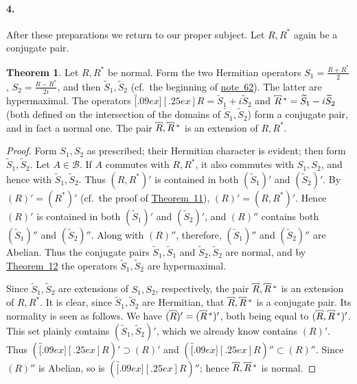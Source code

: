 \documentclass[
  paper=b5,
  twoside=true,
  fontsize=13pt,
  headings=normal,
  bookmarkpackage=false
]{scrartcl}
\theoremstyle{definition}
\newtheorem{theorem}{Theorem}
\newcommand{\NoteRef}[1]{\hyperref[fn:#1]{note~#1}}
\newcommand{\TheoremRef}[1]{\hyperref[thm:#1]{Theorem~#1}}
\newcommand{\MaximalExtension}[1]{\overbracket[.09ex][.25ex]{#1}}
\newcommand{\AdjointMaximalExtension}[1]{\MaximalExtension{#1}\vphantom{#1}^{*}}
\begin{document}
\paragraph*{4.}\label{sec:iv-4}
After these preparations we return to our proper subject.  Let
\(R,R^*\) again be a conjugate pair.

\begin{theorem}\label{thm:14}
Let \(R,R^*\) be normal. Form the two Hermitian operators
\({S_1=\frac{R+R^*}{2}}\), \({S_2=\frac{R-R^*}{2i}}\), and then
\(\widetilde S_1,\widetilde S_2\) (cf.\ the beginning of
\NoteRef{62}). The latter are hypermaximal. The operators
\(\MaximalExtension{R}=\widetilde S_1+i\widetilde S_2\) and
\(\AdjointMaximalExtension{R}=\widetilde S_1-i\widetilde S_2\) (both defined on the intersection of the domains of
\(\widetilde S_1,\widetilde S_2\)) form a conjugate pair, and in fact a
normal one.  The pair \(\MaximalExtension{R},\AdjointMaximalExtension{R}\) is an extension
of \(R,R^*\).
\end{theorem}

\begin{proof}
Form \(S_1,S_2\) as prescribed; their Hermitian character is evident;
then form \(\widetilde S_1,\widetilde S_2\).  Let
\(A\in\mathcal B\).  If \(A\) commutes with \(R,R^*\), it also commutes
with \(S_1,S_2\), and hence with \(\widetilde S_1,\widetilde S_2\).
Thus \((R,R^*)'\) is contained in both \((\widetilde S_1)'\) and
\((\widetilde S_2)'\). By \((R)'=(R^*)'\) (cf.\ the proof of
\TheoremRef{11}), \((R)'=(R,R^*)'\). Hence \((R)'\) is contained in
both \((\widetilde S_1)'\) and \((\widetilde S_2)'\), and \((R)''\)
contains both \((\widetilde S_1)''\) and \((\widetilde S_2)''\). Along with \((R)''\), therefore,
\((\widetilde S_1)''\) and \((\widetilde S_2)''\) are Abelian.  Thus the
conjugate pairs
\(\widetilde S_1,\widetilde S_1\) and
\(\widetilde S_2,\widetilde S_2\) are normal, and by
\TheoremRef{12} the operators
\(\widetilde S_1,\widetilde S_2\) are hypermaximal.

Since \(\widetilde S_1,\widetilde S_2\) are extensions of \(S_1,S_2\),
respectively, the pair \(\MaximalExtension{R},\AdjointMaximalExtension{R}\) is an extension
of \(R,R^*\).  It is clear, since
\(\widetilde S_1,\widetilde S_2\) are Hermitian, that
\(\MaximalExtension{R},\AdjointMaximalExtension{R}\) is a conjugate pair.  Its normality is
seen as follows. We have \((\MaximalExtension{R})'=(\AdjointMaximalExtension{R})'\),
both being equal to \((\MaximalExtension{R},\AdjointMaximalExtension{R})'\). This set plainly
contains \((\widetilde S_1,\widetilde S_2)'\), which we already know
contains \((R)'\). Thus \((\MaximalExtension{R})'\supset(R)'\) and
\((\MaximalExtension{R})''\subset(R)''\). Since \((R)''\) is Abelian, so is \((\MaximalExtension{R})''\); hence
\(\MaximalExtension{R},\AdjointMaximalExtension{R}\) is normal.
\end{proof}
\end{document}
